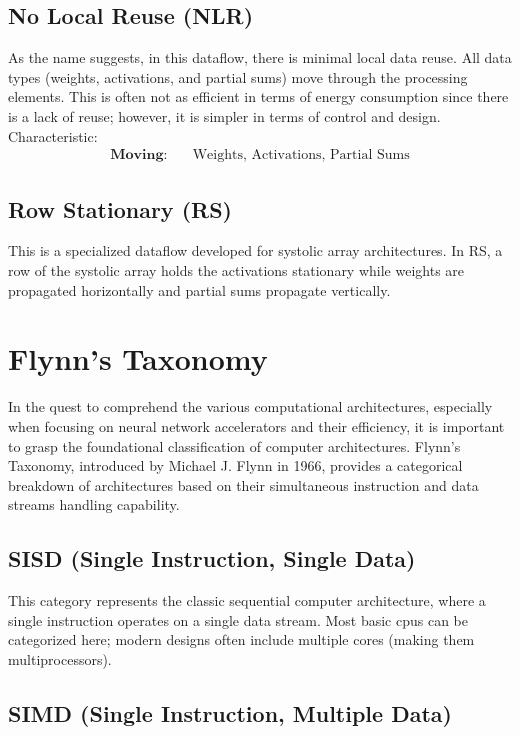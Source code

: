 \subsection*{No Local Reuse (NLR)}
As the name suggests, in this dataflow, there is minimal local data reuse. All data types (weights, activations, and partial sums) move through the processing elements. This is often not as efficient in terms of energy consumption since there is a lack of reuse; however, it is simpler in terms of control and design. Characteristic:
\begin{align*}
\textbf{Moving:} & \quad \text{Weights, Activations, Partial Sums}
\end{align*}

\subsection*{Row Stationary (RS)}
This is a specialized dataflow developed for systolic array architectures. In RS, a row of the systolic array holds the activations stationary while weights are propagated horizontally and partial sums propagate vertically.


\section{Flynn's Taxonomy}

In the quest to comprehend the various computational architectures, especially when focusing on neural network accelerators and their efficiency, it is important to grasp the foundational classification of computer architectures. Flynn's Taxonomy, introduced by Michael J. Flynn in 1966, provides a categorical breakdown of architectures based on their simultaneous instruction and data streams handling capability.

\subsection*{SISD (Single Instruction, Single Data)}

This category represents the classic sequential computer architecture, where a single instruction operates on a single data stream. Most basic \glspl{cpu} can be categorized here; modern designs often include multiple cores (making them multiprocessors).

\subsection*{SIMD (Single Instruction, Multiple Data)}

